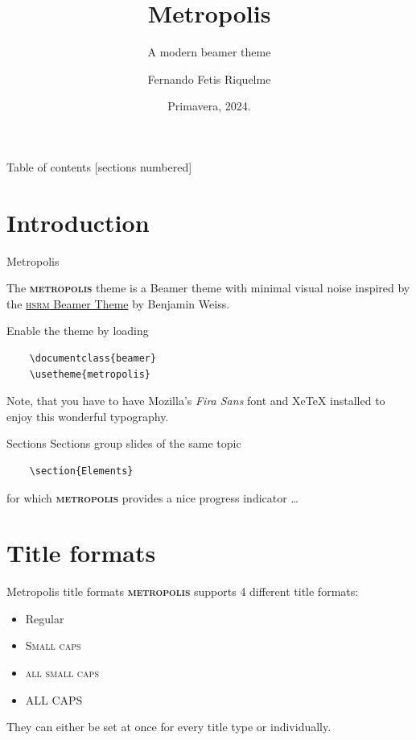 \documentclass[10pt]{beamer}
\title{Metropolis}
\subtitle{A modern beamer theme}
\date{Primavera, 2024.}
\author{Fernando Fetis Riquelme}
\institute{Universidad de Chile}
\newcommand{\themename}{\textbf{\textsc{metropolis}}\xspace}
\begin{document}
\maketitle

\begin{frame}{Table of contents}
  [sections numbered]
  \tableofcontents[hideallsubsections]
\end{frame}

\section{Introduction}

\begin{frame}[fragile]{Metropolis}

  The \themename theme is a Beamer theme with minimal visual noise
  inspired by the \href{https://github.com/hsrmbeamertheme/hsrmbeamertheme}{\textsc{hsrm} Beamer
  Theme} by Benjamin Weiss.

  Enable the theme by loading

  \begin{verbatim}    \documentclass{beamer}
    \usetheme{metropolis}\end{verbatim}

  Note, that you have to have Mozilla's \emph{Fira Sans} font and XeTeX
  installed to enjoy this wonderful typography.
\end{frame}
\begin{frame}[fragile]{Sections}
  Sections group slides of the same topic

  \begin{verbatim}    \section{Elements}\end{verbatim}

  for which \themename provides a nice progress indicator \ldots
\end{frame}

\section{Title formats}

\begin{frame}{Metropolis title formats}
	\themename supports 4 different title formats:
	\begin{itemize}
		\item Regular
		\item \textsc{Small caps}
		\item \textsc{all small caps}
		\item ALL CAPS
	\end{itemize}
	They can either be set at once for every title type or individually.
\end{frame}
\end{document}
